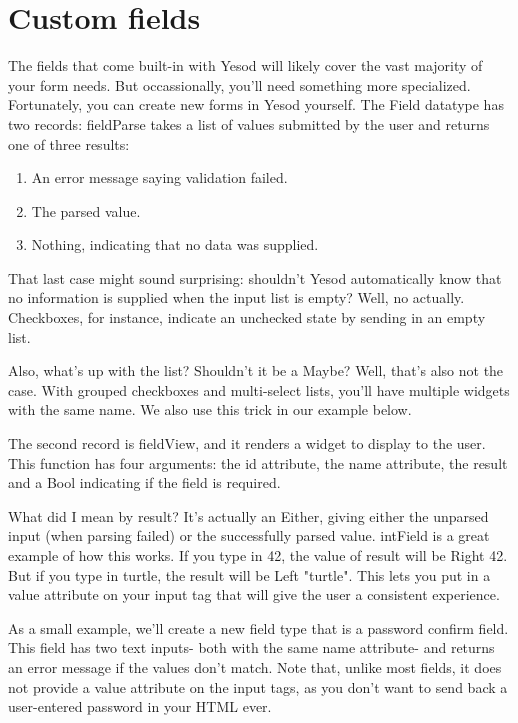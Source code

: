 \section{Custom fields}

The fields that come built-in with Yesod will likely cover the vast majority of your form
needs. But occassionally, you'll need something more specialized. Fortunately, you can
create new forms in Yesod yourself. The Field datatype has two records: fieldParse takes a
list of values submitted by the user and returns one of three results:
\begin{enumerate}
 \item An error message saying validation failed.
 \item The parsed value.
 \item Nothing, indicating that no data was supplied.
\end{enumerate}

That last case might sound surprising: shouldn't Yesod automatically know that no
information is supplied when the input list is empty? Well, no actually. Checkboxes, for
instance, indicate an unchecked state by sending in an empty list.

Also, what's up with the list? Shouldn't it be a Maybe? Well, that's also not the case.
With grouped checkboxes and multi-select lists, you'll have multiple widgets with the same
name. We also use this trick in our example below.

The second record is fieldView, and it renders a widget to display to the user. This
function has four arguments: the id attribute, the name attribute, the result and a Bool
indicating if the field is required.

What did I mean by result? It's actually an Either, giving either the unparsed input (when
parsing failed) or the successfully parsed value. intField is a great example of how this
works. If you type in 42, the value of result will be Right 42. But if you type in turtle,
the result will be Left "turtle". This lets you put in a value attribute on your input tag
that will give the user a consistent experience.

As a small example, we'll create a new field type that is a password confirm field. This
field has two text inputs- both with the same name attribute- and returns an error message
if the values don't match. Note that, unlike most fields, it does not provide a value
attribute on the input tags, as you don't want to send back a user-entered password in
your HTML ever.


